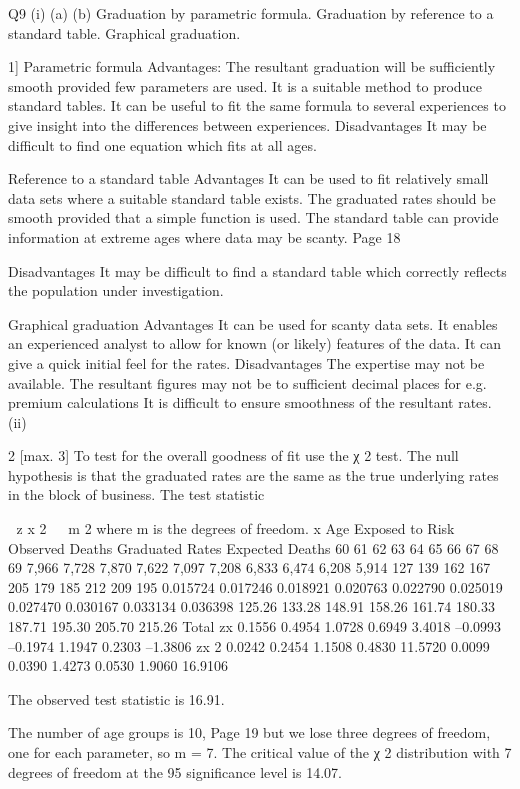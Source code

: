 \documentclass[a4paper,12pt]{article}
\begin{document}
Q9
(i)
(a)
(b)
Graduation by parametric formula. 
Graduation by reference to a standard table. 
Graphical graduation. 
{1]
Parametric formula
Advantages:
The resultant graduation will be sufficiently smooth provided
few parameters are used.
It is a suitable method to produce standard tables.
It can be useful to fit the same formula to several
experiences to give insight into the differences between
experiences.
Disadvantages
It may be difficult to find one equation which fits at all ages.




Reference to a standard table
Advantages
It can be used to fit relatively small data sets where a
suitable standard table exists.
The graduated rates should be smooth provided that a simple
function is used.
The standard table can provide information at extreme ages
where data may be scanty.
Page 18


Disadvantages
It may be difficult to find a standard table which
correctly reflects the population under investigation.

Graphical graduation
Advantages
It can be used for scanty data sets.
It enables an experienced analyst to allow for known (or likely)
features of the data.
It can give a quick initial feel for the rates.
Disadvantages
The expertise may not be available.
The resultant figures may not be to sufficient
decimal places for e.g. premium calculations
It is difficult to ensure smoothness of the resultant rates.
(ii)






{2}
[max. 3]
To test for the overall goodness of fit use the χ 2 test.
The null hypothesis is that the graduated rates are the same as the true
underlying rates in the block of business.
The test statistic

 z x 2   m 2 where m is the degrees of freedom.
x
Age Exposed to
Risk Observed
Deaths Graduated
Rates Expected
Deaths
60
61
62
63
64
65
66
67
68
69 7,966
7,728
7,870
7,622
7,097
7,208
6,833
6,474
6,208
5,914 127
139
162
167
205
179
185
212
209
195 0.015724
0.017246
0.018921
0.020763
0.022790
0.025019
0.027470
0.030167
0.033134
0.036398 125.26
133.28
148.91
158.26
161.74
180.33
187.71
195.30
205.70
215.26
Total
zx
0.1556
0.4954
1.0728
0.6949
3.4018
–0.0993
–0.1974
1.1947
0.2303
–1.3806
zx 2
0.0242
0.2454
1.1508
0.4830
11.5720
0.0099
0.0390
1.4273
0.0530
1.9060
16.9106

The observed test statistic is 16.91.

The number of age groups is 10,
Page 19%
but we lose three degrees of freedom, one for each parameter, 
so m = 7. 
The critical value of the χ 2 distribution with 7 degrees of freedom at the 95%
significance level is 14.07.

}
\end{document}
